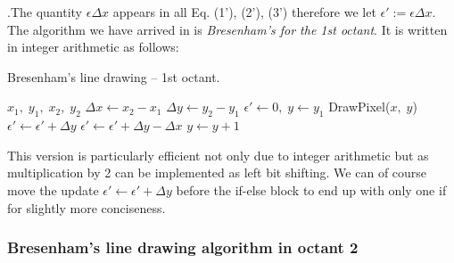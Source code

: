 \documentclass[a4paper]{article}
\begin{document}
.The quantity $\epsilon\Delta x$ appears in all Eq. (1'), (2'), (3') therefore we let $\epsilon' := \epsilon \Delta x$. The algorithm we have arrived in is \textit{Bresenham's for the 1st octant}. It is written in integer arithmetic as follows:
\begin{algorithm}[H]
\caption{Bresenham's line drawing -- 1st octant.}
\label{alg:bres_1st_oct}
\begin{algorithmic}[1]
 {$x_1,\; y_1,\; x_2,\; y_2$} 
	\State $\Delta x \leftarrow x_2 - x_1$
	\State $\Delta y \leftarrow y_2 - y_1$
	\State $\epsilon' \leftarrow 0, \; y\leftarrow y_1$ 
	\State DrawPixel($x,\; y$)
		\State $\epsilon' \leftarrow \epsilon' + \Delta y$ 
	\Else
		\State $\epsilon' \leftarrow \epsilon' + \Delta y - \Delta x$ 
		\State $y\leftarrow y + 1$
	\EndIf
\EndFor
\EndIf
\EndProcedure
\end{algorithmic}
\end{algorithm}
This version is particularly efficient not only due to integer arithmetic but as multiplication by 2 can be implemented as left bit shifting. We can of course move the update $\epsilon' \leftarrow \epsilon'+\Delta y$ before the if-else block to end up with only one if for slightly more conciseness. 


\subsubsection{Bresenham's line drawing algorithm in octant 2}
\end{document}
